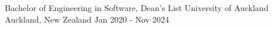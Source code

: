 
\begin{cventries}
  \cventry
    {Bachelor of Engineering in Software, Dean's List} %
    {University of Auckland} %
    {Auckland, New Zealand} %
    {Jan 2020 - Nov 2024} %
    \item{}
    \vspace{-15mm}

\end{cventries}
